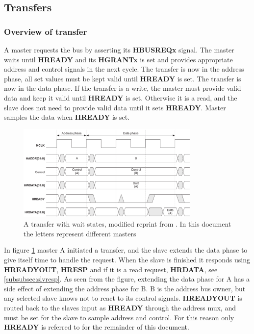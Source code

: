 \subsection{Transfers}

\subsubsection{Overview of transfer}

A master requests the bus by asserting its \textbf{HBUSREQx} signal. The master waits until \textbf{HREADY} and its \textbf{HGRANTx} is set and provides appropriate address and control signals in the next cycle. The transfer is now in the address phase, all set values must be kept valid until \textbf{HREADY} is set. The transfer is now in the data phase. If the transfer is a write, the master must provide valid data and keep it valid until \textbf{HREADY} is set. Otherwise it is a read, and the slave does not need to provide valid data until it sets \textbf{HREADY}. Master samples the data when \textbf{HREADY} is set.
\newpage

\begin{figure}[hbt]
    \begin{center}
        \includegraphics[width=0.8\textwidth]{figs/AHB/transfer.png}
    \end{center}
    \caption{A transfer with wait states, modified reprint from \cite{amba}. In this document the letters represent different masters}
    \label{fig:transfer}
\end{figure}

In figure \ref{fig:transfer} master A initiated a transfer, and the slave extends the data phase to give itself time to handle the request. When the slave is finished it responds using \textbf{HREADYOUT}, \textbf{HRESP} and if it is a read request, \textbf{HRDATA}, see \ref{subsubsec:slvresp}. As seen from the figure, extending the data phase for A has a side effect of extending the address phase for B. B is the address bus owner, but any selected slave knows not to react to its control signals. \textbf{HREADYOUT} is routed back to the slaves input as \textbf{HREADY} through the address mux, and must be set for the slave to sample address and control. For this reason only \textbf{HREADY} is referred to for the remainder of this document. 

